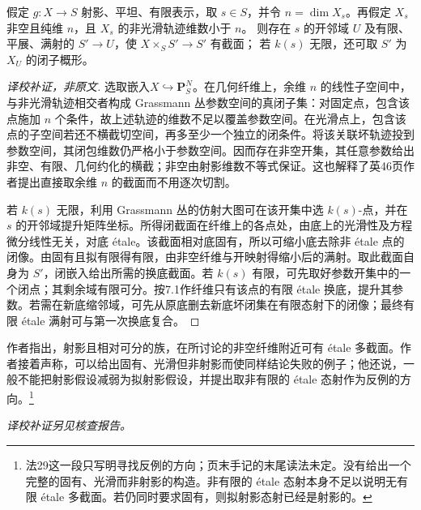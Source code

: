 \begingroup
\def\OO{\mathcal O}\def\FF{\mathcal F}\def\GG{\mathcal G}
\def\PP{\mathbf P}\def\calP{\mathcal P}\def\dd{\delta}
\def\Div{\operatorname{Div}}\def\depth{\operatorname{depth}}
\def\pr{\operatorname{pr}}\def\coker{\operatorname{coker}}
假定 $g:X\to S$ 射影、平坦、有限表示，取 $s\in S$，并令 $n=\dim X_s$。再假定 $X_s$ 非空且纯维 $n$，且 $X_s$ 的非光滑轨迹维数小于 $n$。
则存在 $s$ 的开邻域 $U$ 及有限、平展、满射的 $S'\to U$，使 $X\times_S S'\to S'$ 有截面；
若 $k(s)$ 无限，还可取 $S'$ 为 $X_U$ 的闭子概形。
\begin{proof}[译校补证，非原文]
选取嵌入$X\hookrightarrow\mathbf P^N_S$。在几何纤维上，余维 $n$ 的线性子空间中，与非光滑轨迹相交者构成 Grassmann 丛参数空间的真闭子集：对固定点，包含该点施加 $n$ 个条件，故上述轨迹的维数不足以覆盖参数空间。在光滑点上，包含该点的子空间若还不横截切空间，再多至少一个独立的闭条件。将该关联坏轨迹投到参数空间，其闭包维数仍严格小于参数空间。因而存在非空开集，其任意参数给出非空、有限、几何约化的横截；非空由射影维数不等式保证。这也解释了英46页作者提出直接取余维 $n$ 的截面而不用逐次切割。

若 $k(s)$ 无限，利用 Grassmann 丛的仿射大图可在该开集中选 $k(s)$-点，并在 $s$ 的开邻域提升矩阵坐标。所得闭截面在纤维上的各点处，由底上的光滑性及方程微分线性无关，对底 étale。该截面相对底固有，所以可缩小底去除非 étale 点的闭像。由固有且拟有限得有限，由非空纤维与开映射得缩小后的满射。取此截面自身为 $S'$，闭嵌入给出所需的换底截面。若 $k(s)$ 有限，可先取好参数开集中的一个闭点；其剩余域有限可分。按7.1作纤维只有该点的有限 étale 换底，提升其参数。若需在新底缩邻域，可先从原底删去新底坏闭集在有限态射下的闭像；最终有限 étale 满射可与第一次换底复合。
\end{proof}

作者指出，射影且相对可分的族，在所讨论的非空纤维附近可有 étale 多截面。作者接着声称，可以给出固有、光滑但非射影而使同样结论失败的例子；他还说，一般不能把射影假设减弱为拟射影假设，并提出取非有限的 étale 态射作为反例的方向。\footnote{法29这一段只写明寻找反例的方向；页末手记的末尾读法未定。没有给出一个完整的固有、光滑而非射影的构造。非有限的 étale 态射本身不足以说明无有限 étale 多截面。若仍同时要求固有，则拟射影态射已经是射影的。}

\par\noindent\textit{译校补证另见核查报告。}

\endgroup
